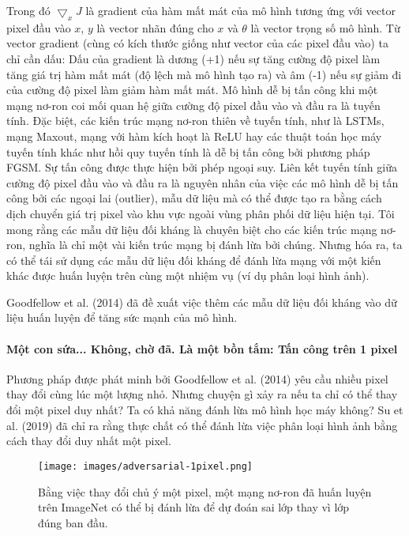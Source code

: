 Trong đó $\bigtriangledown_x{}J$ là gradient của hàm mất mát của mô hình tương ứng với vector pixel đầu vào $x$, $y$ là vector nhãn đúng cho $x$ và $\theta$ là vector trọng số mô hình. Từ vector gradient (cùng có kích thước giống như vector của các pixel đầu vào) ta chỉ cần dấu: Dấu của gradient là dương (+1) nếu sự tăng cường độ pixel làm tăng giá trị hàm mất mát (độ lệch mà mô hình tạo ra) và âm (-1) nếu sự giảm đi của cường độ pixel làm giảm hàm mất mát. Mô hình dễ bị tấn công khi một mạng nơ-ron coi mối quan hệ giữa cường độ pixel đầu vào và đầu ra là tuyến tính. Đặc biệt, các kiến trúc mạng nơ-ron thiên về tuyến tính, như là LSTMs, mạng Maxout, mạng với hàm kích hoạt là ReLU hay các thuật toán học máy tuyến tính khác như hồi quy tuyến tính là dễ bị tấn công bởi phương pháp FGSM. Sự tấn công được thực hiện bởi phép ngoại suy. Liên kết tuyến tính giữa cường độ pixel đầu vào và đầu ra là nguyên nhân của việc các mô hình dễ bị tấn công bởi các ngoại lai (outlier), mẫu dữ liệu mà có thể được tạo ra bằng cách dịch chuyển giá trị pixel vào khu vực ngoài vùng phân phối dữ liệu hiện tại. Tôi mong rằng các mẫu dữ liệu đối kháng là chuyên biệt cho các kiến trúc mạng nơ-ron, nghĩa là chỉ một vài kiến trúc mạng bị đánh lừa bởi chúng. Nhưng hóa ra, ta có thể tái sử dụng các mẫu dữ liệu đối kháng để đánh lừa mạng với một kiến khác được huấn luyện trên cùng một nhiệm vụ (ví dụ phân loại hình ảnh).

Goodfellow et al. (2014) đã đề xuất việc thêm các mẫu dữ liệu đối kháng vào dữ liệu huấn luyện để tăng sức mạnh của mô hình.

\paragraph{Một con sứa... Không, chờ đã. Là một bồn tắm: Tấn công trên 1 pixel}

Phương pháp được phát minh bởi Goodfellow et al. (2014) yêu cầu nhiều pixel thay đổi cùng lúc một lượng nhỏ. Nhưng chuyện gì xảy ra nếu ta chỉ có thể thay đổi một pixel duy nhất? Ta có khả năng đánh lừa mô hình học máy không? Su et al. (2019) đã chỉ ra rằng thực chất có thể đánh lừa việc phân loại hình ảnh bằng cách thay đổi duy nhất một pixel.

\begin{figure*}[h!]
	\centering
	\texttt{[image: images/adversarial-1pixel.png]}
	\label{fig:6_4}
	\caption{Bằng việc thay đổi chủ ý một pixel, một mạng nơ-ron đã huấn luyện trên ImageNet có thể bị đánh lừa để dự đoán sai lớp thay vì lớp đúng ban đầu.}
\end{figure*}

